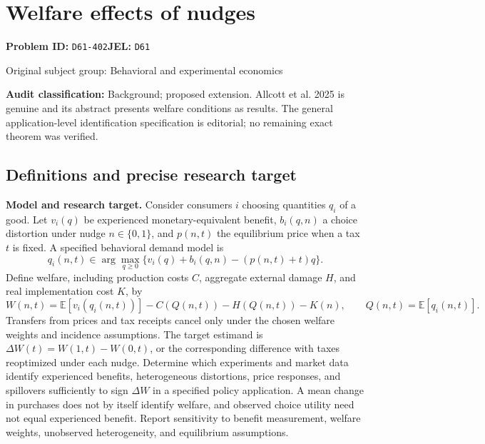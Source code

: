 \documentclass[11pt,a4paper]{article}
\begin{document}
\section*{Welfare effects of nudges}
\textbf{Problem ID:} \texttt{D61-402}\quad \textbf{JEL:} \texttt{D61}\par
\label{problem:OP-0309}
{\sffamily\small\color{muted}Original subject group: Behavioral and experimental economics\par}
\label{definitions:problem:30007591}
\textbf{Audit classification:} Background; proposed extension. Allcott et al. 2025 is genuine and its abstract presents welfare conditions as results. The general application-level identification specification is editorial; no remaining exact theorem was verified.
\subsection*{Definitions and precise research target}
\textbf{Model and research target.} Consider consumers \(i\) choosing quantities \(q_i\) of a good. Let \(v_i(q)\) be experienced monetary-equivalent benefit, \(b_i(q,n)\) a choice distortion under nudge \(n\in\{0,1\}\), and \(p(n,t)\) the equilibrium price when a tax \(t\) is fixed. A specified behavioral demand model is
\[q_i(n,t)\in\arg\max_{q\geq0}\{v_i(q)+b_i(q,n)-(p(n,t)+t)q\}.\]
Define welfare, including production costs \(C\), aggregate external damage \(H\), and real implementation cost \(K\), by
\[W(n,t)=\mathbb E[v_i(q_i(n,t))]-C(Q(n,t))-H(Q(n,t))-K(n),\qquad Q(n,t)=\mathbb E[q_i(n,t)].\]
Transfers from prices and tax receipts cancel only under the chosen welfare weights and incidence assumptions. The target estimand is \(\Delta W(t)=W(1,t)-W(0,t)\), or the corresponding difference with taxes reoptimized under each nudge. Determine which experiments and market data identify experienced benefits, heterogeneous distortions, price responses, and spillovers sufficiently to sign \(\Delta W\) in a specified policy application. A mean change in purchases does not by itself identify welfare, and observed choice utility need not equal experienced benefit. Report sensitivity to benefit measurement, welfare weights, unobserved heterogeneity, and equilibrium assumptions.
\end{document}
